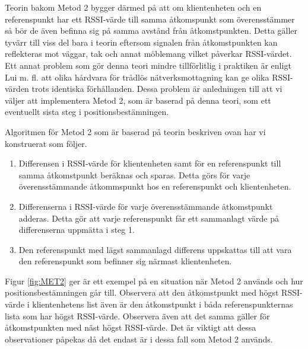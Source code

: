 \documentclass[swedish, a4paper,12pt]{article}
\begin{document}
Teorin bakom Metod 2 bygger därmed på att om klientenheten och en referenspunkt har ett RSSI-värde till samma åtkomspunkt som överensstämmer så bör de även befinna sig på samma avstånd från åtkomstpunkten. Detta gäller tyvärr till viss del bara i teorin eftersom signalen från åtkomstpunkten kan reflekteras mot väggar, tak och annat möblemang vilket påverkar RSSI-värdet\cite{zanca2008experimental}. Ett annat problem som gör denna teori mindre tillförlitlig i praktiken är enligt Lui m. fl. att olika hårdvara för trådlös nätverksmottagning kan ge olika RSSI-värden trots identiska förhållanden\cite{problem_with_RSSI}. Dessa problem är anledningen till att vi väljer att implementera Metod 2, som är baserad på denna teori, som ett eventuellt sista steg i positionsbestämningen.

Algoritmen för Metod 2 som är baserad på teorin beskriven ovan har vi konstruerat som följer.

\begin{enumerate}
  \item Differensen i RSSI-värde för klientenheten samt för en referenspunkt till samma åtkomstpunkt beräknas och sparas. Detta görs för varje överensstämmande åtkommspunkt hos en referenspunkt och klientenheten.
  \item Differenserna i RSSI-värde för varje överensstämmande åtkomstpunkt adderas. Detta gör att varje referenspunkt får ett sammanlagt värde på differenserna uppmätta i steg 1.
  \item Den referenspunkt med lägst sammanlagd differens uppskattas till att vara den referenspunkt som befinner sig närmast klientenheten.
\end{enumerate}


Figur \ref{fig:MET2} ger är ett exempel på en situation när Metod 2 används och hur positionsbestämningen går till. Observera att den åtkomstpunkt med högst RSSI-värde i klientenhetens list även är den åtkomstpunkt i båda referenspunkternas lista som har högst RSSI-värde. Observera även att det samma gäller för åtkomstpunkten med näst högst RSSI-värde. Det är viktigt att dessa observationer påpekas då det endast är i dessa fall som Metod 2 används.
\end{document}
